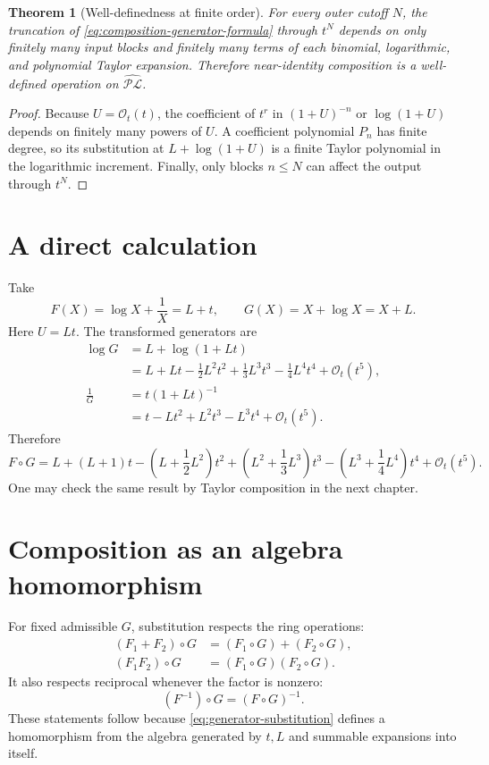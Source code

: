 \documentclass[11pt,oneside]{book}
\newtheorem{theorem}{Theorem}[chapter]
\theoremstyle{definition}
\theoremstyle{remark}
\newcommand{\PLfield}{\widehat{\mathscr{PL}}}
\newcommand{\bigO}{\mathcal O}
\newcommand{\compose}{\mathbin{\circ}}
\begin{document}
\begin{theorem}[Well-definedness at finite order]\label{thm:composition-well-defined}
For every outer cutoff $N$, the truncation of \eqref{eq:composition-generator-formula}
through $t^N$ depends on only finitely many input blocks and finitely many
terms of each binomial, logarithmic, and polynomial Taylor expansion.
Therefore near-identity composition is a well-defined operation on
$\PLfield$.
\end{theorem}
\begin{proof}
Because $U=\bigO_t(t)$, the coefficient of $t^r$ in $(1+U)^{-n}$ or
$\log(1+U)$ depends on finitely many powers of $U$.  A coefficient polynomial
$P_n$ has finite degree, so its substitution at
$L+\log(1+U)$ is a finite Taylor polynomial in the logarithmic increment.
Finally, only blocks $n\le N$ can affect the output through $t^N$.
\end{proof}

\section{A direct calculation}
Take
\[
 F(X)=\log X+\frac1X=L+t,
 \qquad
 G(X)=X+\log X=X+L.
\]
Here $U=Lt$.  The transformed generators are
\begin{align*}
 \log G
 &=L+\log(1+Lt)\\
 &=L+Lt-\frac12L^2t^2+\frac13L^3t^3
   -\frac14L^4t^4+\bigO_t(t^5),\\
 \frac1G
 &=t(1+Lt)^{-1}\\
 &=t-Lt^2+L^2t^3-L^3t^4+\bigO_t(t^5).
\end{align*}
Therefore
\begin{equation}\label{eq:composition-example}
 F\compose G
 =L+(L+1)t-\left(L+\frac12L^2\right)t^2
 +\left(L^2+\frac13L^3\right)t^3
 -\left(L^3+\frac14L^4\right)t^4
 +\bigO_t(t^5).
\end{equation}
One may check the same result by Taylor composition in the next chapter.

\section{Composition as an algebra homomorphism}
For fixed admissible $G$, substitution respects the ring operations:
\begin{align}\label{eq:composition-homomorphism}
 (F_1+F_2)\compose G&=(F_1\compose G)+(F_2\compose G),\\
 (F_1F_2)\compose G&=(F_1\compose G)(F_2\compose G).
\end{align}
It also respects reciprocal whenever the factor is nonzero:
\[
 (F^{-1})\compose G=(F\compose G)^{-1}.
\]
These statements follow because \eqref{eq:generator-substitution} defines a
homomorphism from the algebra generated by $t,L$ and summable expansions into
itself.
\end{document}
